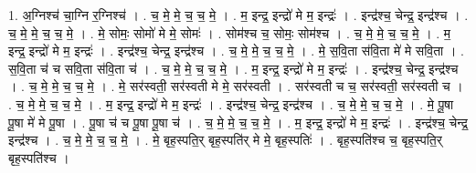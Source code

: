 \documentclass[17pt]{extarticle}
\begin{document}
1. अ॒ग्निश्च॑ चा॒ग्नि र॒ग्निश्च॑ । . च॒ मे॒ मे॒ च॒ च॒ मे॒ । . म॒ इन्द्र॒ इन्द्रो॑ मे म॒ इन्द्रः॑ । . इन्द्र॑श्च॒ चेन्द्र॒ इन्द्र॑श्च । . च॒ मे॒ मे॒ च॒ च॒ मे॒ । . मे॒ सोमः॒ सोमो॑ मे मे॒ सोमः॑ । . सोम॑श्च च॒ सोमः॒ सोम॑श्च । . च॒ मे॒ मे॒ च॒ च॒ मे॒ । . म॒ इन्द्र॒ इन्द्रो॑ मे म॒ इन्द्रः॑ । . इन्द्र॑श्च॒ चेन्द्र॒ इन्द्र॑श्च । . च॒ मे॒ मे॒ च॒ च॒ मे॒ । . मे॒ स॒वि॒ता स॑वि॒ता मे॑ मे सवि॒ता । . स॒वि॒ता च॑ च सवि॒ता स॑वि॒ता च॑ । . च॒ मे॒ मे॒ च॒ च॒ मे॒ । . म॒ इन्द्र॒ इन्द्रो॑ मे म॒ इन्द्रः॑ । . इन्द्र॑श्च॒ चेन्द्र॒ इन्द्र॑श्च । . च॒ मे॒ मे॒ च॒ च॒ मे॒ । . मे॒ सर॑स्वती॒ सर॑स्वती मे मे॒ सर॑स्वती । . सर॑स्वती च च॒ सर॑स्वती॒ सर॑स्वती च । . च॒ मे॒ मे॒ च॒ च॒ मे॒ । . म॒ इन्द्र॒ इन्द्रो॑ मे म॒ इन्द्रः॑ । . इन्द्र॑श्च॒ चेन्द्र॒ इन्द्र॑श्च । . च॒ मे॒ मे॒ च॒ च॒ मे॒ । . मे॒ पू॒षा पू॒षा मे॑ मे पू॒षा । . पू॒षा च॑ च पू॒षा पू॒षा च॑ । . च॒ मे॒ मे॒ च॒ च॒ मे॒ । . म॒ इन्द्र॒ इन्द्रो॑ मे म॒ इन्द्रः॑ । . इन्द्र॑श्च॒ चेन्द्र॒ इन्द्र॑श्च । . च॒ मे॒ मे॒ च॒ च॒ मे॒ । . मे॒ बृह॒स्पति॒र् बृह॒स्पति॑र् मे मे॒ बृह॒स्पतिः॑ । . बृह॒स्पति॑श्च च॒ बृह॒स्पति॒र् बृह॒स्पति॑श्च । \newline
\end{document}

